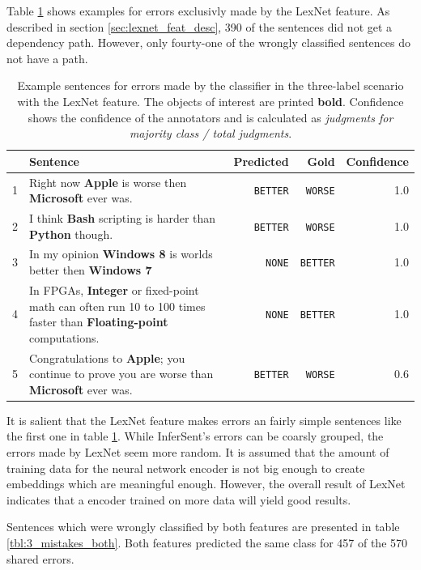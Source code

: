 Table \ref{tbl:3_mistakes_lexnet} shows examples for errors exclusivly made by the LexNet feature. As described in section \ref{sec:lexnet_feat_desc}, 390 of the sentences did not get a dependency path. However, only fourty-one of the wrongly classified sentences do not have a path.

\begin{table}[h]
\caption{Example sentences for errors made by the classifier in the three-label scenario with the LexNet feature. The objects of interest are printed \textbf{bold}. Confidence shows the confidence of the annotators and is calculated as \emph{judgments for majority class / total judgments}.}
\label{tbl:3_mistakes_lexnet}
\begin{tabularx}{\linewidth}{lXrrr}
\toprule
 & Sentence & Predicted & Gold & Confidence \\ \midrule
1 & Right now \textbf{Apple} is worse then \textbf{Microsoft} ever was. & \texttt{BETTER} & \texttt{WORSE} & 1.0 \\
2 & I think \textbf{Bash} scripting is harder than \textbf{Python} though. & \texttt{BETTER} & \texttt{WORSE} & 1.0\\
3 & In my opinion \textbf{Windows 8} is worlds better then \textbf{Windows 7} & \texttt{NONE} & \texttt{BETTER} & 1.0\\
4 & In FPGAs, \textbf{Integer} or fixed-point math can often run 10 to 100 times faster than \textbf{Floating-point} 
computations. & \texttt{NONE} & \texttt{BETTER} & 1.0\\
5 & Congratulations to \textbf{Apple}; you continue to prove you are worse than \textbf{Microsoft} ever was. & \texttt{BETTER} & \texttt{WORSE} & 0.6\\
 \bottomrule
\end{tabularx}
\end{table}

It is salient that the LexNet feature makes errors an fairly simple sentences like the first one in table \ref{tbl:3_mistakes_lexnet}. While InferSent's errors can be coarsly grouped, the errors made by LexNet seem more random. It is assumed that the amount of training data for the neural network encoder is not big enough to create embeddings which are meaningful enough. However, the overall result of LexNet indicates that a encoder trained on more data will yield good results.


Sentences which were wrongly classified by both features are presented in table \ref{tbl:3_mistakes_both}. Both features predicted the same class for 457 of the 570 shared errors.


